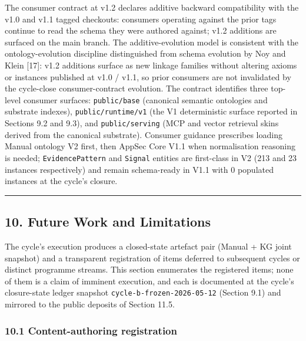 \documentclass[
]{article}
\begin{document}
The consumer contract at v1.2 declares additive backward compatibility
with the v1.0 and v1.1 tagged checkouts: consumers operating against the
prior tags continue to read the schema they were authored against; v1.2
additions are surfaced on the main branch. The additive-evolution model
is consistent with the ontology-evolution discipline distinguished from
schema evolution by Noy and Klein {[}17{]}: v1.2 additions surface as
new linkage families without altering axioms or instances published at
v1.0 / v1.1, so prior consumers are not invalidated by the cycle-close
consumer-contract evolution. The contract identifies three top-level
consumer surfaces: \texttt{public/base} (canonical semantic ontologies
and substrate indexes), \texttt{public/runtime/v1} (the V1 deterministic
surface reported in Sections 9.2 and 9.3), and \texttt{public/serving}
(MCP and vector retrieval skins derived from the canonical substrate).
Consumer guidance prescribes loading Manual ontology V2 first, then
AppSec Core V1.1 when normalisation reasoning is needed;
\texttt{EvidencePattern} and \texttt{Signal} entities are first-class in
V2 (213 and 23 instances respectively) and remain schema-ready in V1.1
with 0 populated instances at the cycle's closure.

\begin{center}\rule{0.5\linewidth}{0.5pt}\end{center}

\subsection{10. Future Work and
Limitations}\label{future-work-and-limitations}

The cycle's execution produces a closed-state artefact pair (Manual + KG
joint snapshot) and a transparent registration of items deferred to
subsequent cycles or distinct programme streams. This section enumerates
the registered items; none of them is a claim of imminent execution, and
each is documented at the cycle's closure-state ledger snapshot
\texttt{cycle-b-frozen-2026-05-12} (Section 9.1) and mirrored to the
public deposits of Section 11.5.

\subsubsection{10.1 Content-authoring
registration}\label{content-authoring-registration}
\end{document}
